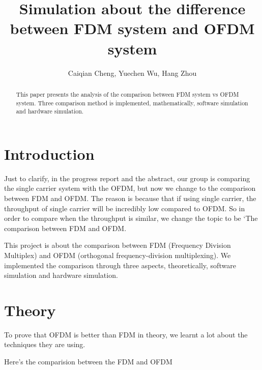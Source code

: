 \documentclass[twocolumn,conference]{IEEEtran}
\begin{document}
\title{\textbf{Simulation about the difference between 
FDM system and OFDM system
}}
\author{Caiqian Cheng, Yuechen Wu, Hang Zhou
}
\maketitle
\thispagestyle{fancy}
\begin{abstract}
This paper presents the analysis of the comparison between FDM system vs OFDM system. Three comparison method is implemented, mathematically, software simulation and hardware simulation.
\end{abstract}



\section{Introduction}
Just to clarify, in the progress report and the abstract, our group is comparing the single carrier system with the OFDM, but now we change to the comparison between FDM and OFDM. The reason is because that if using single carrier, the throughput of single carrier will be incredibly low compared to OFDM. So in order to compare when the throughput is similar, we change the topic to be ‘The comparison between FDM and OFDM.

This project is about the comparison between FDM (Frequency Division Multiplex) and OFDM (orthogonal frequency-division multiplexing). We implemented the comparison through three aspects, theoretically, software simulation and hardware simulation.



\section{Theory}
To prove that OFDM is better than FDM in theory, we learnt a lot about the techniques they are using.


Here's the comparision between the FDM and OFDM
\end{document}
